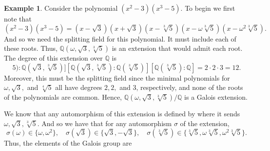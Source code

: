 \documentclass[leqno]{article}
\theoremstyle{definition}
\theoremstyle{remark}
\theoremstyle{definition}
\newtheorem{example}{Example}
\begin{document}
    \begin{example}
        Consider the polynomial $(x^2-3)(x^3-5)$. To begin we first note that 
                            \begin{equation*}
                                (x^2-3)(x^3-5)=(x-\sqrt{3})(x+\sqrt{3})(x-\sqrt[3]{5})(x-\omega\sqrt[3]{5})(x-\omega^2\sqrt[3]{5}).
                            \end{equation*}
                        And so we need the splitting field for this polynomial. It must include each of these roots. Thus, $\mathbb{Q}(\omega,\sqrt{3},\sqrt[3]{5})$ is an extension that would admit each root. The degree of this extension over $\mathbb{Q}$ is
                            \begin{equation*}
                                [\mathbb{Q}(\omega,\sqrt{3},\sqrt[3]{5})\colon\mathbb{Q}(\sqrt{3},\sqrt[3]{5})][\mathbb{Q}(\sqrt{3},\sqrt[3]{5})\colon\mathbb{Q}(\sqrt[3]{5})][\mathbb{Q}(\sqrt[3]{5})\colon\mathbb{Q}]=2\cdot2\cdot3=12.
                            \end{equation*}
                        Moreover, this must be the splitting field since the minimal polynomials for $\omega, \sqrt{3},$ and $\sqrt[4]{5}$ all have degrees $2,2,$ and $3$, respectively, and none of the roots of the polynomials are common. Hence, $\mathbb{Q}(\omega,\sqrt{3},\sqrt[3]{5})/\mathbb{Q}$ is a Galois extension.\par\hspace{4mm} We know that any automorphism of this extension is defined by where it sends $\omega, \sqrt{3},\sqrt[3]{5}$. And so we have that for any automorphism $\sigma$ of the extension,
                            \begin{equation*}
                                \sigma(\omega)\in\{\omega,\omega^2\},\quad\sigma(\sqrt{3})\in\{\sqrt{3},-\sqrt{3}\},\quad\sigma(\sqrt[3]{5})\in\{\sqrt[3]{5},\omega\sqrt[3]{5},\omega^2\sqrt[3]{5}\}.
                            \end{equation*}
                        Thus, the elements of the Galois group are
                            \begin{align*}

\end{align*}
\end{example}
\end{document}
